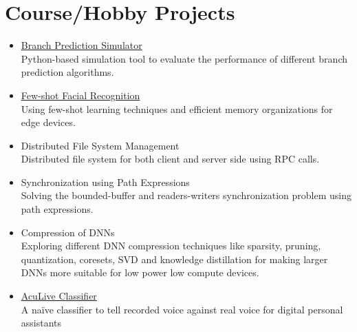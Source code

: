\documentclass[letterpaper,11pt]{article}
\begin{document}
\section{Course/Hobby Projects}

\begin{itemize}
    \item\href{https://github.com/cyanmishra92/PyBrachPredSim}{Branch Prediction Simulator}\\
    Python-based simulation tool to evaluate the performance of different branch prediction algorithms. 
    \item \href{https://github.com/cyanmishra92/FewShotEye} {Few-shot Facial Recognition}\\
    Using few-shot learning techniques and efficient memory organizations for edge devices.
    
    \item Distributed File System Management \\
    Distributed file system for both client and server side using RPC calls.
    \item Synchronization using Path Expressions \\
    Solving the bounded-buffer and readers-writers synchronization problem using path expressions. 
    \item Compression of DNNs \\
    Exploring different DNN compression techniques like sparsity, pruning, quantization, coresets, SVD and knowledge distillation for making larger DNNs more suitable for low power low compute devices.  

    \item \href{https://github.com/cyanmishra92/AcuLive}{AcuLive Classifier}\\
    A na\"ive classifier to tell recorded voice against real voice for digital personal assistants
\end{itemize}
\end{document}
